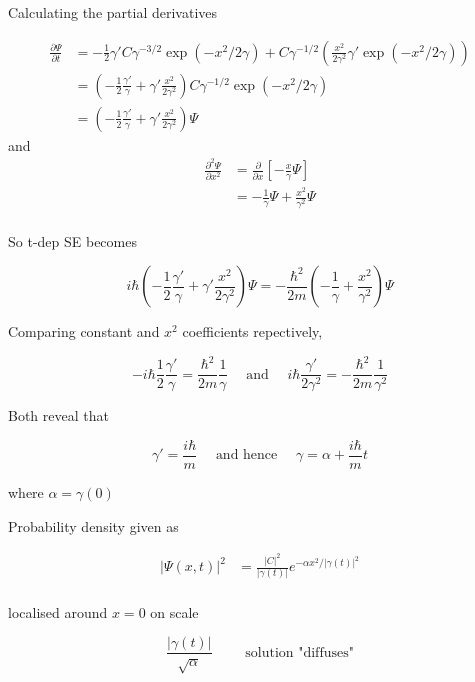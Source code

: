 \documentclass[a4paper]{article}
\begin{document}
Calculating the partial derivatives

\begin{align*}
\frac{\partial \Psi }{\partial t}& = -\frac{1}{2} \gamma' C \gamma^{-3/2} \exp(-x^{2}/2\gamma)  + C \gamma^{-1/2}  \left(\frac{x^{2}}{2 \gamma^{2}} \gamma' \exp(-x^{2}/2\gamma) \right)    \\
& = \left( - \frac{1}{2} \frac{\gamma'}{\gamma} + \gamma' \frac{x^{2}}{2 \gamma^{2}} \right) C \gamma^{-1/2} \exp(-x^{2}/2\gamma) \\
& = \left( - \frac{1}{2} \frac{\gamma'}{\gamma} + \gamma' \frac{x^{2}}{2 \gamma^{2}} \right) \Psi
\end{align*}  
and 
\begin{align*}
\frac{\partial^{2} \Psi }{\partial x^{2}} & = \frac{\partial }{\partial x} \left[ -  \frac{x}{\gamma} \Psi \right] \\
& =  -  \frac{1}{\gamma} \Psi + \frac{x^{2}}{\gamma^{2}} \Psi   \\
\end{align*}      

So t-dep SE becomes

\[ i \hbar \left( - \frac{1}{2} \frac{\gamma'}{\gamma} + \gamma '\frac{x^{2}}{2 \gamma^{2}} \right) \Psi = - \frac{\hbar^{2}}{2m} \left(   -\frac{1}{\gamma} + \frac{x^{2}}{\gamma^{2}} \right) \Psi  \]    

Comparing constant and $ x^{2} $ coefficients repectively,        

\[ - i \hbar \frac{1}{2} \frac{\gamma'}{\gamma} = \frac{\hbar^{2}}{2m} \frac{1}{\gamma} \quad \text{ and } \quad i\hbar \frac{\gamma'}{2\gamma^{2}} = - \frac{\hbar^{2}}{2m} \frac{1}{\gamma^{2}}   \]

Both reveal that



\[ \gamma' = \frac{i \hbar}{m} \quad \text{ and hence } \quad \gamma = \alpha + \frac{i \hbar}{m} t  \]

where $ \alpha = \gamma(0) $


Probability density given as 

\begin{align*}
|   \Psi(x,t)  |^{2} & = \frac{| C |^{2}}{| \gamma(t) |} e^{- \alpha x^{2} / | \gamma(t) |^{2} } \\
\end{align*}


localised around $ x = 0 $ on scale 

\[ \frac{| \gamma(t) |}{\sqrt{\alpha}} \qquad \text{ solution "diffuses"}\]
\end{document}
